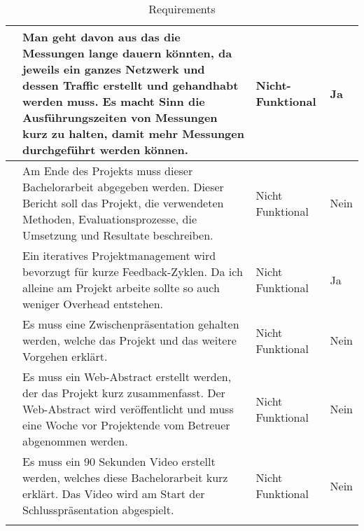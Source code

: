 \begin{longtable}{N p{8.5cm} l l}
      & Man geht davon aus das die Messungen lange dauern könnten, da jeweils ein ganzes Netzwerk und dessen Traffic erstellt und gehandhabt werden muss. Es macht Sinn die Ausführungszeiten von Messungen kurz zu halten, damit mehr Messungen durchgeführt werden können. & Nicht-Funktional & Ja \\ \midrule
      & Am Ende des Projekts muss dieser Bachelorarbeit abgegeben werden. Dieser Bericht soll das Projekt, die verwendeten Methoden, Evaluationsprozesse, die Umsetzung und Resultate beschreiben.
                & Nicht Funktional & Nein \\ \midrule
      & Ein iteratives Projektmanagement wird bevorzugt für kurze Feedback-Zyklen. Da ich alleine am Projekt arbeite sollte so auch weniger Overhead entstehen. & Nicht Funktional & Ja \\ \midrule
      & Es muss eine Zwischenpräsentation gehalten werden, welche das Projekt und das weitere Vorgehen erklärt.
                & Nicht Funktional & Nein \\ \midrule
      & Es muss ein Web-Abstract erstellt werden, der das Projekt kurz zusammenfasst. Der Web-Abstract wird veröffentlicht und muss eine Woche vor Projektende vom Betreuer abgenommen werden.
                & Nicht Funktional & Nein \\ \midrule
      & Es muss ein 90 Sekunden Video erstellt werden, welches diese Bachelorarbeit kurz erklärt. Das Video wird am Start der Schlusspräsentation abgespielt.
                & Nicht Funktional & Nein \\ \midrule
    \bottomrule
    \caption{Requirements}\label{tab:requirements}
\end{longtable}

